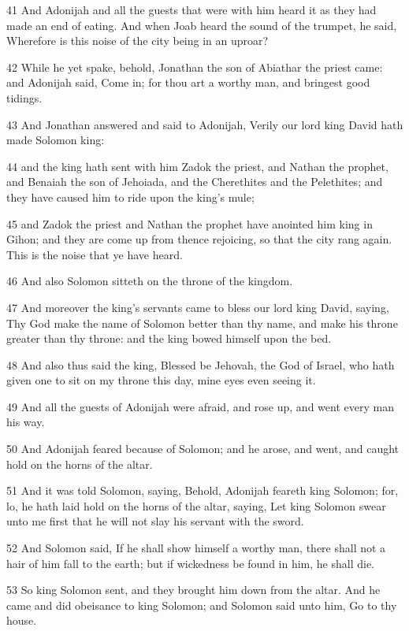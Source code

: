 \par 41 And Adonijah and all the guests that were with him heard it as they had made an end of eating. And when Joab heard the sound of the trumpet, he said, Wherefore is this noise of the city being in an uproar?
\par 42 While he yet spake, behold, Jonathan the son of Abiathar the priest came: and Adonijah said, Come in; for thou art a worthy man, and bringest good tidings.
\par 43 And Jonathan answered and said to Adonijah, Verily our lord king David hath made Solomon king:
\par 44 and the king hath sent with him Zadok the priest, and Nathan the prophet, and Benaiah the son of Jehoiada, and the Cherethites and the Pelethites; and they have caused him to ride upon the king's mule;
\par 45 and Zadok the priest and Nathan the prophet have anointed him king in Gihon; and they are come up from thence rejoicing, so that the city rang again. This is the noise that ye have heard.
\par 46 And also Solomon sitteth on the throne of the kingdom.
\par 47 And moreover the king's servants came to bless our lord king David, saying, Thy God make the name of Solomon better than thy name, and make his throne greater than thy throne: and the king bowed himself upon the bed.
\par 48 And also thus said the king, Blessed be Jehovah, the God of Israel, who hath given one to sit on my throne this day, mine eyes even seeing it.
\par 49 And all the guests of Adonijah were afraid, and rose up, and went every man his way.
\par 50 And Adonijah feared because of Solomon; and he arose, and went, and caught hold on the horns of the altar.
\par 51 And it was told Solomon, saying, Behold, Adonijah feareth king Solomon; for, lo, he hath laid hold on the horns of the altar, saying, Let king Solomon swear unto me first that he will not slay his servant with the sword.
\par 52 And Solomon said, If he shall show himself a worthy man, there shall not a hair of him fall to the earth; but if wickedness be found in him, he shall die.
\par 53 So king Solomon sent, and they brought him down from the altar. And he came and did obeisance to king Solomon; and Solomon said unto him, Go to thy house.

